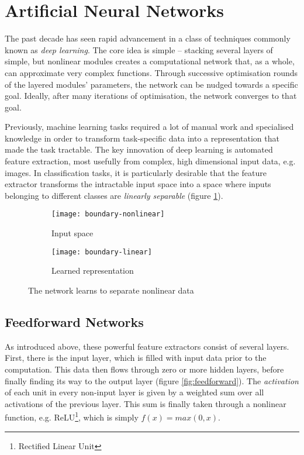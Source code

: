 \documentclass[../../report.tex]{subfiles}
\begin{document}
\section{Artificial Neural Networks}

The past decade has seen rapid advancement in a class of techniques commonly
known as \emph{deep learning}. The core idea is simple -- stacking several
layers of simple, but nonlinear modules creates a computational network that, as
a whole, can approximate very complex functions. Through successive optimisation
rounds of the layered modules' parameters, the network can be nudged towards a
specific goal. Ideally, after many iterations of optimisation, the network
converges to that goal.

Previously, machine learning tasks required a lot of manual work and specialised
knowledge in order to transform task-specific data into a representation that
made the task tractable. The key innovation of deep learning is automated
feature extraction, most usefully from complex, high dimensional input data,
e.g. images. In classification tasks, it is particularly desirable that the
feature extractor transforms the intractable input space into a space where
inputs belonging to different classes are \emph{linearly separable} (figure
\ref{fig:representation-learning}). \cite{LeCun2015}

\begin{figure}
  \centering
  \begin{subfigure}[b]{0.49\textwidth}
    \centering
    \texttt{[image: boundary-nonlinear]}
    \caption{Input space}
  \end{subfigure}
  \hfill
  \begin{subfigure}[b]{0.49\textwidth}
    \centering
    \texttt{[image: boundary-linear]}
    \caption{Learned representation}
  \end{subfigure}
  \caption{The network learns to separate nonlinear data \cite{Olah2014}}
  \label{fig:representation-learning}
\end{figure}

\subsection{Feedforward Networks}

As introduced above, these powerful feature extractors consist of several
layers. First, there is the input layer, which is filled with input data prior
to the computation. This data then flows through zero or more hidden layers,
before finally finding its way to the output layer (figure
\ref{fig:feedforward}). The \emph{activation} of each unit in every non-input
layer is given by a weighted sum over all activations of the previous layer.
This sum is finally taken through a nonlinear function, e.g.
ReLU\footnote{Rectified Linear Unit}, which is simply $f(x) = max(0, x)$.
\end{document}
